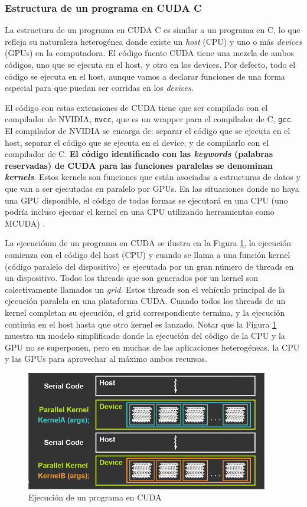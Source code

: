\subsubsection{Estructura de un programa en CUDA C}

La estructura de un programa en CUDA C es similar a un programa en C, lo que refleja su naturaleza heterogénea donde
existe un \textit{host} (CPU) y uno o más \textit{devices} (GPUs) en la computadora. El código fuente CUDA tiene una
mezcla de ambos códigos, uno que se ejecuta en el host, y otro en los devices. Por defecto, todo el código se ejecuta en
el host, aunque vamos a declarar funciones de una forma especial para que puedan ser corridas en los \textit{devices}.

El código con estas extensiones de CUDA tiene que ser compilado con el compilador de NVIDIA, \texttt{nvcc}, que es un
wrapper para el compilador de C, \texttt{gcc}. El compilador de NVIDIA se encarga de: separar el código que se ejecuta en
el host, separar el código que se ejecuta en el device, y de compilarlo con el compilador de C. \textbf{El código
identificado con las \textit{keywords} (palabras reservadas) de CUDA para las funciones paralelas se denominan
\textit{kernels}}. Estos kernels son funciones que están asociadas a estructuras de datos y que van a ser ejecutadas en
paralelo por GPUs. En las situaciones donde no haya una GPU disponible, el código de todas formas se ejecutará en una
CPU (uno podría incluso ejecuar el kernel en una CPU utilizando herramientas como MCUDA) \cite{sutter2005}.

La ejecuciónm de un programa en CUDA se ilustra en la Figura \ref{fig:execution_cuda}, la ejecución comienza con el
código del host (CPU) y cuando se llama a una función kernel (código paralelo del dispositivo) es ejecutada por un gran
número de threads en un dispositivo. Todos los threads que son generados por un kernel son colectivamente llamados un
\textit{grid}. Estos threads son el vehículo principal de la ejecución paralela en una plataforma CUDA. Cuando todos los
threads de un kernel completan su ejecución, el grid correspondiente termina, y la ejecución continúa en el host hasta
que otro kernel es lanzado. Notar que la Figura \ref{fig:execution_cuda} muestra un modelo simplificado donde la
ejecución del código de la CPU y la GPU no se superponen, pero en muchas de las aplicaciones heterogéneas, la CPU y las
GPUs para aprovechar al máximo ambos recursos.

\begin{figure}[H]
  \centering
  \includegraphics[width=400px]{./images/execution_cuda.png}
  \caption{Ejecución de un programa en CUDA}
  \label{fig:execution_cuda}
\end{figure}

